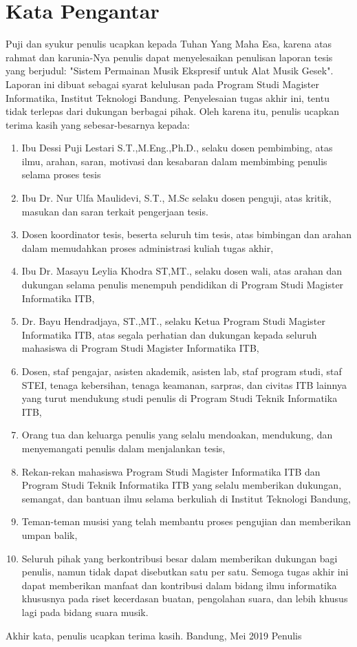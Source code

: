 \chapter*{Kata Pengantar}

Puji dan syukur penulis ucapkan kepada Tuhan Yang Maha Esa, karena atas rahmat dan karunia-Nya penulis dapat menyelesaikan penulisan laporan tesis yang berjudul: "Sistem Permainan Musik Ekspresif untuk Alat Musik Gesek". Laporan ini dibuat sebagai syarat kelulusan pada Program Studi Magister Informatika, Institut Teknologi Bandung. Penyelesaian tugas akhir ini, tentu tidak terlepas dari dukungan berbagai pihak. Oleh karena itu, penulis ucapkan terima kasih yang sebesar-besarnya kepada:

\begin{enumerate}
\item Ibu Dessi Puji Lestari S.T.,M.Eng.,Ph.D., selaku dosen pembimbing, atas ilmu, arahan, saran, motivasi dan kesabaran dalam membimbing penulis selama proses tesis
\item Ibu Dr. Nur Ulfa Maulidevi, S.T., M.Sc selaku dosen penguji, atas kritik, masukan dan saran terkait pengerjaan tesis. %
% 
\item %
Dosen koordinator tesis, beserta seluruh tim tesis, atas bimbingan dan arahan dalam memudahkan proses administrasi kuliah tugas akhir,
\item Ibu Dr. Masayu Leylia Khodra ST,MT., selaku dosen wali, atas arahan dan dukungan selama penulis menempuh pendidikan di Program Studi Magister Informatika ITB,
\item Dr. Bayu Hendradjaya, ST.,MT., selaku Ketua Program Studi Magister Informatika ITB, atas segala perhatian dan dukungan kepada seluruh mahasiswa di Program Studi Magister Informatika ITB,
\item Dosen, staf pengajar, asisten akademik, asisten lab, staf program studi, staf STEI, tenaga kebersihan, tenaga keamanan, sarpras, dan civitas ITB lainnya yang turut mendukung studi penulis di Program Studi Teknik Informatika ITB,
\item Orang tua dan keluarga penulis yang selalu mendoakan, mendukung, dan menyemangati penulis dalam menjalankan tesis,
\item Rekan-rekan mahasiswa Program Studi Magister Informatika ITB dan Program Studi Teknik Informatika ITB yang selalu memberikan dukungan, semangat, dan bantuan ilmu selama berkuliah di Institut Teknologi Bandung,
\item Teman-teman musisi yang telah membantu proses pengujian dan memberikan umpan balik,
\item Seluruh pihak yang berkontribusi besar dalam memberikan dukungan bagi penulis, namun tidak dapat disebutkan satu per satu. Semoga tugas akhir ini dapat memberikan manfaat dan kontribusi dalam bidang ilmu informatika khususnya pada riset kecerdasan buatan, pengolahan suara, dan lebih khusus lagi pada bidang suara musik.
\end{enumerate}

Akhir kata, penulis ucapkan terima kasih.
Bandung, Mei 2019
Penulis
